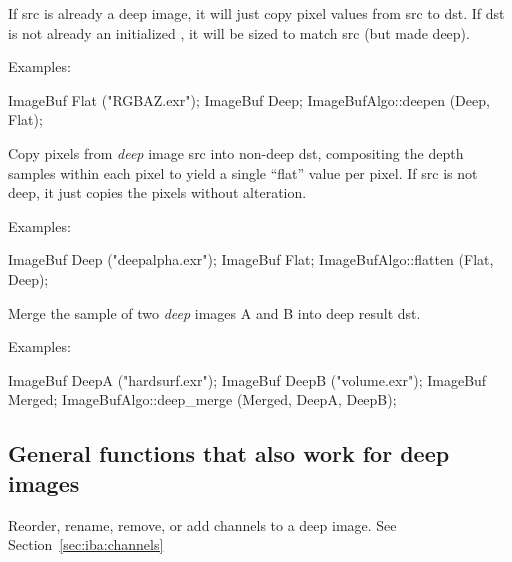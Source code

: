 If {\cf src} is already a deep image, it will just copy pixel values from
{\cf src} to {\cf dst}. If {\cf dst} is not already an initialized
\ImageBuf, it will be sized to match {\cf src} (but made deep).

\smallskip
\noindent Examples:
\begin{code}
    ImageBuf Flat ("RGBAZ.exr");
    ImageBuf Deep;
    ImageBufAlgo::deepen (Deep, Flat);
\end{code}
\apiend

  
Copy pixels from \emph{deep} image {\cf src} into non-deep {\cf dst},
compositing the depth samples within each pixel to yield a single ``flat''
value per pixel. If {\cf src} is not deep, it just copies the pixels without
alteration.

\smallskip
\noindent Examples:
\begin{code}
    ImageBuf Deep ("deepalpha.exr");
    ImageBuf Flat;
    ImageBufAlgo::flatten (Flat, Deep);
\end{code}
\apiend

  
\NEW %
Merge the sample of two \emph{deep} images {\cf A} and {\cf B} into deep
result {\cf dst}.

\smallskip
\noindent Examples:
\begin{code}
    ImageBuf DeepA ("hardsurf.exr");
    ImageBuf DeepB ("volume.exr");
    ImageBuf Merged;
    ImageBufAlgo::deep_merge (Merged, DeepA, DeepB);
\end{code}
\apiend

\subsection{General functions that also work for deep images}

Reorder, rename, remove, or add channels to a deep image.
See Section~\ref{sec:iba:channels}
\apiend

